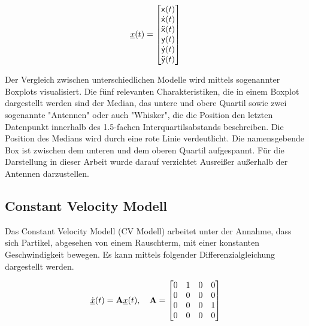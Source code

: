 \begin{equation} \label{eq:definitionCA}
    {\underline{x}}(t) = 
    \begin{bmatrix}
        \mathsf{x}(t) \\
        \dot{\mathsf{x}}(t) \\
        \ddot{\mathsf{x}}(t) \\
        \mathsf{y}(t) \\
        \dot{\mathsf{y}}(t) \\
        \ddot{\mathsf{y}}(t)
       \end{bmatrix} 
\end{equation}

Der Vergleich zwischen unterschiedlichen Modelle wird mittels sogenannter Boxplots visualisiert.
Die fünf relevanten Charakteristiken, die in einem Boxplot dargestellt werden sind 
der Median, das untere und obere Quartil sowie zwei sogenannte "Antennen" oder auch "Whisker", die die Position den letzten Datenpunkt innerhalb des 1.5-fachen Interquartilsabstands beschreiben.
Die Position des Medians wird durch eine rote Linie verdeutlicht.
Die namensgebende Box ist zwischen dem unteren und dem oberen Quartil aufgespannt.
Für die Darstellung in dieser Arbeit wurde darauf verzichtet Ausreißer außerhalb der Antennen darzustellen.



\subsection{Constant Velocity Modell}

Das Constant Velocity Modell (CV Modell) arbeitet unter der Annahme, dass sich Partikel, 
abgesehen von einem Rauschterm, mit einer konstanten Geschwindigkeit bewegen.
Es kann mittels folgender Differenzialgleichung dargestellt werden.

\begin{equation*} \label{eq:speedCV}
    \dot{{\underline{x}}}(t) = {{\mathbf{A}}}{\underline{x}}(t), \quad {\ensuremath{{\mathbf{A}}}} = 
    \begin{bmatrix}
        0 & 1 & 0 & 0 \\
        0 & 0 & 0 & 0 \\
        0 & 0 & 0 & 1\\
        0 & 0 & 0 & 0
    \end{bmatrix} 
\end{equation*}

